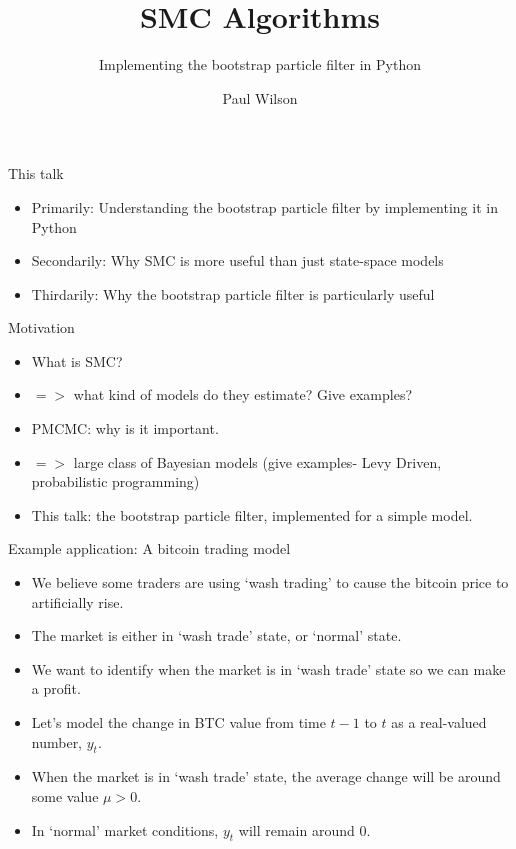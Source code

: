 \documentclass[pdf]
{beamer}
\title{SMC Algorithms}
\subtitle{Implementing the bootstrap particle filter in Python}
\author{Paul Wilson}
\begin{document}


\begin{frame}
\titlepage
\end{frame}

\begin{frame}{This talk}
\begin{itemize}
	\item Primarily: Understanding the bootstrap particle filter by implementing it in Python
	\item Secondarily: Why SMC is more useful than just state-space models
	\item Thirdarily: Why the bootstrap particle filter is particularly useful
\end{itemize}
\end{frame}

\begin{frame}{Motivation}
\begin{itemize}
	\item What is SMC?
	\item $=>$ what kind of models do they estimate? Give examples?
	\item PMCMC: why is it important.
	\item $=>$ large class of Bayesian models (give examples- Levy Driven, probabilistic programming)
	\item This talk: the bootstrap particle filter, implemented for a simple model.
\end{itemize}
\end{frame}

\begin{frame}{Example application: A bitcoin trading model}
\begin{itemize}
	\item We believe some traders are using `wash trading' to cause the bitcoin price to artificially rise.
	\item The market is either in `wash trade' state, or `normal' state.
	\item We want to identify when the market is in `wash trade' state so we can make a profit.
	\item Let's model the change in BTC value from time $t - 1$ to $t$ as a real-valued number, $y_t$.
	\item When the market is in `wash trade' state, the average change will be around some value $\mu > 0$.
	\item In `normal' market conditions, $y_t$ will remain around $0$.
\end{itemize}
\end{frame}
\end{document}

